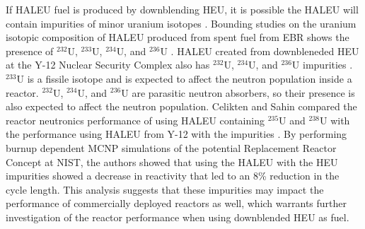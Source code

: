 If \gls{HALEU} fuel is produced by downblending \gls{HEU}, it is possible 
the \gls{HALEU} will contain impurities of minor uranium 
isotopes \cite{nuclear_energy_institute_establishing_2022}. Bounding studies on the 
uranium 
isotopic composition of \gls{HALEU} produced from spent fuel from \gls{EBR} 
shows the presence of $^{232}$U, $^{233}$U, $^{234}$U, and $^{236}$U
\cite{vaden_isotopic_2018}. 
\gls{HALEU} created from downbleneded \gls{HEU} at the Y-12 Nuclear Security 
Complex also has $^{232}$U, $^{234}$U, and $^{236}$U impurities
\cite{nelson_foreign_2010}. $^{233}$U is a fissile 
isotope and is expected to affect the neutron population inside a reactor.
$^{232}$U, $^{234}$U, and $^{236}$U are parasitic neutron absorbers, so 
their presence is also expected to affect the neutron population. 
Celikten and Sahin compared the 
reactor neutronics performance of using \gls{HALEU} containing $^{235}$U 
and $^{238}$U 
with the performance using \gls{HALEU} from Y-12 with the impurities 
\cite{celikten_effects_2021}. By performing burnup dependent \gls{MCNP} 
simulations of the potential Replacement Reactor Concept at \gls{NIST}, 
the authors showed that using the \gls{HALEU} with the \gls{HEU} 
impurities showed a decrease in reactivity that led to an 8\% reduction 
in the cycle length. This analysis suggests that these impurities may 
impact the performance of commercially deployed reactors as well, which 
warrants further investigation of the reactor performance when using 
downblended \gls{HEU} as fuel. 